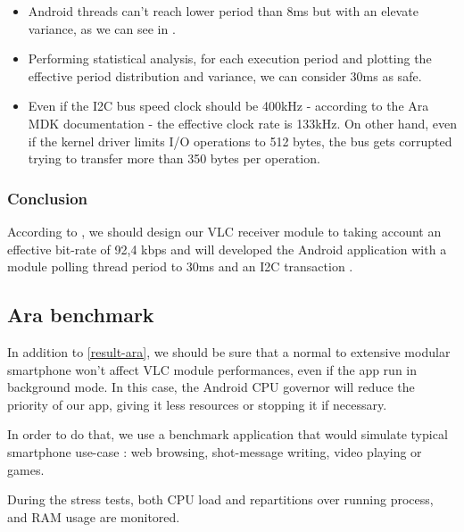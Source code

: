 \begin{itemize}
\item Android threads can't reach lower period than 8ms but with an elevate variance, as we can see in .

\item Performing statistical analysis, for each execution period and plotting the effective period distribution and variance, we can consider 30ms as safe.

\item Even if the I2C bus speed clock should be 400kHz - according to the Ara MDK documentation - the effective clock rate is 133kHz.
On other hand, even if the kernel driver limits I/O operations to 512 bytes, the bus gets corrupted trying to transfer more than 350 bytes per operation.
\end{itemize}

\subsubsection{Conclusion}  \label{conclusion-ara}
According to , we should design our VLC receiver module to taking account an effective bit-rate of 92,4 kbps and will developed the Android application with a module polling thread period to 30ms and an I2C transaction . 


\subsection{Ara benchmark}

In addition to \ref{result-ara}, we should be sure that a normal to extensive modular smartphone won't affect VLC module performances, even if the app run in background mode. In this case, the Android CPU governor will reduce the priority of our app, giving it less resources or stopping it if necessary.

In order to do that, we use a benchmark application that would simulate typical smartphone use-case : web browsing, shot-message writing, video playing or games.

During the stress tests, both CPU load and repartitions over running process, and RAM usage are monitored.

